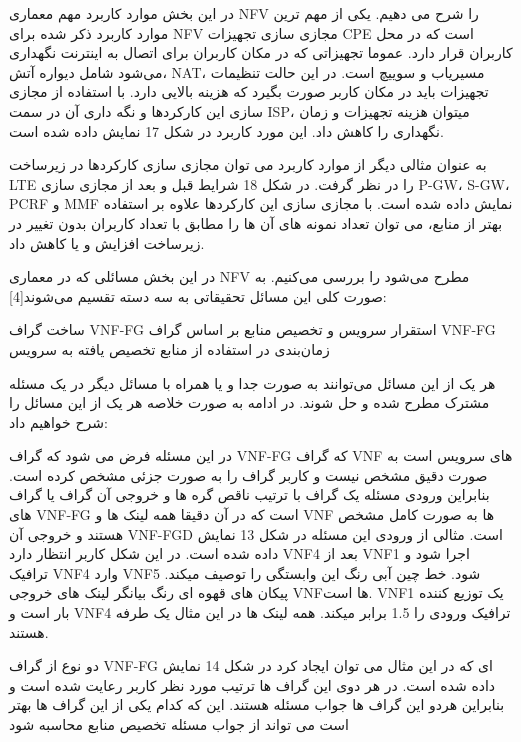 
در این بخش موارد کاربرد مهم معماری NFV را شرح می دهیم. یکی از مهم ترین موارد کاربرد ذکر شده برای NFV مجازی سازی تجهیزات CPE است که در محل کاربران قرار دارد.
عموما تجهیزاتی که در مکان کاربران برای اتصال به اینترنت نگهداری می‌شود شامل دیواره آتش، NAT، مسیریاب و سوییچ است.
در این حالت تنظیمات تجهیزات باید در مکان کاربر صورت بگیرد که هزینه بالایی دارد. با استفاده از مجازی سازی این کارکردها و نگه داری آن در سمت ISP، میتوان هزینه تجهیزات و زمان نگهداری را کاهش داد. این مورد کاربرد در شکل 17 نمایش داده شده است.

 به عنوان مثالی دیگر از موارد کاربرد می توان مجازی سازی کارکردها در زیرساخت LTE را در نظر گرفت. در شکل 18 شرایط قبل و بعد از مجازی سازی P-GW، S-GW، PCRF و MMF نمایش داده شده است. با مجازی سازی این کارکردها علاوه بر استفاده بهتر از منابع، می توان تعداد نمونه های آن ها را مطابق با تعداد کاربران بدون تغییر در زیرساخت افزایش و یا کاهش داد.


در این بخش مسائلی که در معماری NFV مطرح می‌شود را بررسی می‌کنیم. به صورت کلی این مسائل تحقیقاتی به سه دسته تقسیم می‌شوند[4]:


 ساخت گراف VNF-FG
 استقرار سرویس و تخصیص منابع بر اساس گراف VNF-FG
 زمان‌بندی در استفاده از منابع تخصیص یافته به سرویس

هر یک از این مسائل می‌توانند به صورت جدا و یا همراه با مسائل دیگر در یک مسئله مشترک مطرح شده و حل شوند. در ادامه به صورت خلاصه هر یک از این مسائل را شرح خواهیم داد:


در این مسئله فرض می شود که گراف VNF-FG که گراف VNF های سرویس است به صورت دقیق مشخص نیست و کاربر گراف را به صورت جزئی مشخص کرده است. بنابراین ورودی مسئله یک گراف با ترتیب ناقص گره ها و خروجی آن گراف یا گراف های VNF-FG است که در آن دقیقا همه لینک ها و VNF ها به صورت کامل مشخص هستند و خروجی آن VNF-FGD است. مثالی از ورودی این مسئله در شکل 13 نمایش داده شده است. در این شکل کاربر انتظار دارد VNF4 بعد از VNF1 اجرا شود و ترافیک VNF4 وارد VNF5 شود. خط چین آبی رنگ این وابستگی را توصیف میکند. پیکان های قهوه ای رنگ بیانگر لینک های خروجی VNFها است. VNF1 یک توزیع کننده بار است و VNF4 ترافیک ورودی را 1.5 برابر میکند. همه لینک ها در این مثال یک طرفه هستند.

دو نوع از گراف VNF-FG ای که در این مثال می توان ایجاد کرد در شکل 14 نمایش داده شده است. در هر دوی این گراف ها ترتیب مورد نظر کاربر رعایت شده است و بنابراین هردو این گراف ها جواب مسئله هستند. این که کدام یکی از این گراف ها بهتر است می تواند از جواب مسئله تخصیص منابع محاسبه شود

